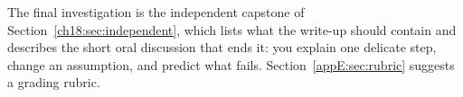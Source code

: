 The final investigation is the independent capstone of Section~\ref{ch18:sec:independent}, which lists what the write-up should contain and describes the short oral discussion that ends it: you explain one delicate step, change an assumption, and predict what fails. Section~\ref{appE:sec:rubric} suggests a grading rubric.

